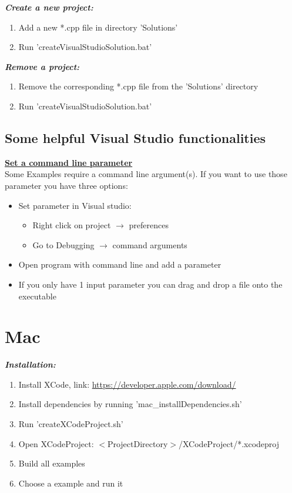 \documentclass[]{article}
\begin{document}
\textit{\textbf{Create a new project:}}
\begin{enumerate}
\item Add a new *.cpp file in directory 'Solutions'
\item Run 'createVisualStudioSolution.bat' \\
\end{enumerate}

\textit{\textbf{Remove a project:}}
\begin{enumerate}
\item Remove the corresponding *.cpp file from the 'Solutions' directory
\item Run 'createVisualStudioSolution.bat' \\
\end{enumerate}

\subsection{Some helpful Visual Studio functionalities \\}

\underline{\textbf{Set a command line parameter}} \\

Some Examples require a command line argument(s). If you want to use those parameter you have three options:
\begin{itemize}
	\item Set parameter in Visual studio:
	\begin{itemize}
		\item Right click on project $\rightarrow$ preferences
		\item Go to Debugging $\rightarrow$ command arguments
	\end{itemize}
	\item Open program with command line and add a parameter
	\item If you only have 1 input parameter you can drag and drop a file onto the executable
\end{itemize}


\newpage
\section{Mac}\label{Mac}

\textit{\textbf{Installation:}}
\begin{enumerate}
	\item Install XCode, link: \url{https://developer.apple.com/download/}
	\item Install dependencies by running 'mac\_installDependencies.sh'
	\item Run 'createXCodeProject.sh'
	\item Open XCodeProject: $<$ProjectDirectory$>$/XCodeProject/*.xcodeproj
	\item Build all examples
	\item Choose a example and run it \\
\end{enumerate}
\end{document}
